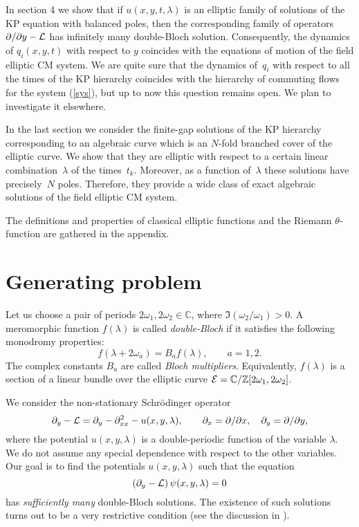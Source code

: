\documentclass[a4paper,11pt]{article}
\newcommand{\p}{\partial}
\newcommand{\comp}{\mathbb C}
\newcommand{\inte}{\mathbb Z}
\newcommand{\cL}{{\cal L}}
\newcommand{\cE}{{\cal E}}
\theoremstyle{plain}
\theoremstyle{remark}
\begin{document}
In section 4 we show that if $u(x,y,t,\lambda)$ is an elliptic family of
solutions of the KP equation with balanced poles, then the corresponding
family of operators $\p/\p y-\cL$ has infinitely many double-Bloch solution.
Consequently, the dynamics of $q_i(x,y,t)$ with respect to $y$
coincides with the equations of motion of the field elliptic CM system.
We are quite sure that the dynamics of~$q_i$ with respect to all the times
of the KP hierarchy coincides with the hierarchy of commuting flows
for the system (\ref{sys}), but up to now this question remains open.
We plan to investigate it elsewhere.

In the last section we consider the finite-gap solutions of the KP
hierarchy corresponding to an algebraic curve which is an $N$-fold
branched cover of the elliptic curve. We show that they are elliptic with
respect to a certain linear combination~$\lambda$ of the times~$t_k$.
Moreover, as a function of~$\lambda$ these solutions have precisely~$N$
poles.  Therefore, they provide a wide class of exact algebraic
solutions of the field elliptic CM system.

The definitions and properties of classical elliptic functions
and the Riemann $\theta$-function are gathered in the appendix.

\section{Generating problem}

Let us choose a pair of periods $2\omega_1, 2\omega_2\in\comp$,
where $\Im(\omega_2/\omega_1)>0$.
A meromorphic function $f(\lambda)$ is called \emph{double-Bloch}
if it satisfies the following monodromy properties:
$$
f(\lambda+2\omega_a)=B_a f(\lambda),\qquad a=1,2.
$$
The complex constants $B_a$ are called \emph{Bloch multipliers}.
Equivalently, $f(\lambda)$ is a section of a linear bundle over
the elliptic curve $\cE=\comp/\inte[2\omega_1,2\omega_2]$.

We consider the non-stationary Schr\"odinger operator
$$
\p_y-\cL=\p_y-\p^2_{xx}-u(x,y,\lambda),
\qquad \p_x=\p/\p x, \quad \p_y=\p/\p y ,
$$
where the potential $u(x,y,\lambda)$ is a double-periodic function of
the variable $\lambda$. We do not assume any special dependence
with respect to the other variables. Our goal is to find the
potentials $u(x,y,\lambda)$ such that the equation
\begin{equation}\label{sch}
\left(\p_y-\cL \right) \psi(x,y,\lambda) = 0
\end{equation}
has \emph{sufficiently many} double-Bloch solutions.
The existence of such solutions turns out to be a very
restrictive condition (see the discussion in \cite{krnest}).
\end{document}
